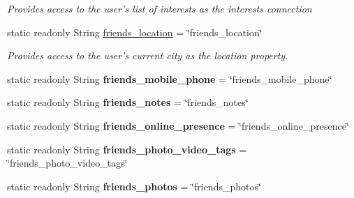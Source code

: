 \begin{DoxyCompactItemize}
\begin{DoxyCompactList}\small\item\em Provides access to the user's list of interests as the interests connection \end{DoxyCompactList}\item 
static readonly String \hyperlink{classcom_1_1shephertz_1_1app42_1_1paas_1_1sdk_1_1csharp_1_1social_1_1_f_b_perms_a47070710fb96f9fb77740f52b7e13b31}{friends\+\_\+location} = \char`\"{}friends\+\_\+location\char`\"{}
\begin{DoxyCompactList}\small\item\em Provides access to the user's current city as the location property. \end{DoxyCompactList}\item 
\hypertarget{classcom_1_1shephertz_1_1app42_1_1paas_1_1sdk_1_1csharp_1_1social_1_1_f_b_perms_a83c7d49e41d651746c3a18e68485d560}{static readonly String {\bfseries friends\+\_\+mobile\+\_\+phone} = \char`\"{}friends\+\_\+mobile\+\_\+phone\char`\"{}}\label{classcom_1_1shephertz_1_1app42_1_1paas_1_1sdk_1_1csharp_1_1social_1_1_f_b_perms_a83c7d49e41d651746c3a18e68485d560}

\item 
\hypertarget{classcom_1_1shephertz_1_1app42_1_1paas_1_1sdk_1_1csharp_1_1social_1_1_f_b_perms_afb7f63681589c954df3d557002d6c356}{static readonly String {\bfseries friends\+\_\+notes} = \char`\"{}friends\+\_\+notes\char`\"{}}\label{classcom_1_1shephertz_1_1app42_1_1paas_1_1sdk_1_1csharp_1_1social_1_1_f_b_perms_afb7f63681589c954df3d557002d6c356}

\item 
\hypertarget{classcom_1_1shephertz_1_1app42_1_1paas_1_1sdk_1_1csharp_1_1social_1_1_f_b_perms_a04de7ce9b87b94b96fdf647db882ed77}{static readonly String {\bfseries friends\+\_\+online\+\_\+presence} = \char`\"{}friends\+\_\+online\+\_\+presence\char`\"{}}\label{classcom_1_1shephertz_1_1app42_1_1paas_1_1sdk_1_1csharp_1_1social_1_1_f_b_perms_a04de7ce9b87b94b96fdf647db882ed77}

\item 
\hypertarget{classcom_1_1shephertz_1_1app42_1_1paas_1_1sdk_1_1csharp_1_1social_1_1_f_b_perms_aab537b9c25a862eab541ecd12f16b857}{static readonly String {\bfseries friends\+\_\+photo\+\_\+video\+\_\+tags} = \char`\"{}friends\+\_\+photo\+\_\+video\+\_\+tags\char`\"{}}\label{classcom_1_1shephertz_1_1app42_1_1paas_1_1sdk_1_1csharp_1_1social_1_1_f_b_perms_aab537b9c25a862eab541ecd12f16b857}

\item 
\hypertarget{classcom_1_1shephertz_1_1app42_1_1paas_1_1sdk_1_1csharp_1_1social_1_1_f_b_perms_a0b664ebdeb2fc7ad11c65fdfe09e64a9}{static readonly String {\bfseries friends\+\_\+photos} = \char`\"{}friends\+\_\+photos\char`\"{}}\label{classcom_1_1shephertz_1_1app42_1_1paas_1_1sdk_1_1csharp_1_1social_1_1_f_b_perms_a0b664ebdeb2fc7ad11c65fdfe09e64a9}


\end{DoxyCompactItemize}
